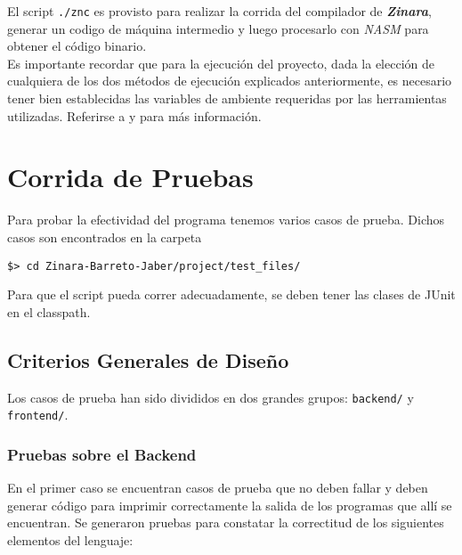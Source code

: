\documentclass[12pt, spanish]{report}
\begin{document}
El script \texttt{./znc} es provisto para realizar la corrida del
compilador de \emph{\textbf{Zinara}}, generar un codigo de máquina
intermedio y luego procesarlo con \emph{NASM} para obtener el código
binario.\\

Es importante recordar que para la ejecuci\'on del proyecto, dada la
elecci\'on de cualquiera de los dos m\'etodos de ejecuci\'on explicados
anteriormente, es necesario tener bien establecidas las variables de
ambiente requeridas por las herramientas utilizadas. Referirse a
\cite{javacup} y \cite{jflex} para m\'as informaci\'on.

\chapter{Corrida de Pruebas}
\label{sec:pruebas}
Para probar la efectividad del programa tenemos varios casos de
prueba. Dichos casos son encontrados en la carpeta

\begin{verbatim}
$> cd Zinara-Barreto-Jaber/project/test_files/
\end{verbatim}

Para que el script pueda correr adecuadamente, se deben tener las clases
de JUnit en el classpath.

\section{Criterios Generales de Diseño}
\label{sec:pruebas:diseño}

Los casos de prueba han sido divididos en dos grandes grupos:
\texttt{backend/} y \texttt{frontend/}.\\

\subsection{Pruebas sobre el Backend}
\label{sec:pruebas:backend}

En el primer caso se encuentran casos de prueba que no deben fallar y
deben generar código para imprimir correctamente la salida de los
programas que allí se encuentran. Se generaron pruebas para constatar
la correctitud de los siguientes elementos del lenguaje:
\end{document}
